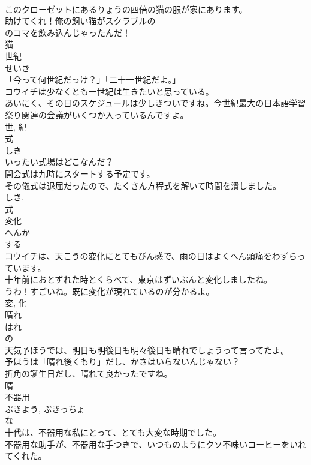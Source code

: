 \documentclass[8pt]{extreport}
\begin{document}
\begin{CJK}{UTF8}{min}
\\	このクローゼットにあるりょうの四倍の猫の服が家にあります。	
\\	助けてくれ！俺の飼い猫がスクラブルの 
\\	のコマを飲み込んじゃったんだ！	
\\	猫	
\\	世紀	
\\	せいき	
\\	「今って何世紀だっけ？」「二十一世紀だよ。」	
\\	コウイチは少なくとも一世紀は生きたいと思っている。	
\\	あいにく、その日のスケジュールは少しきついですね。今世紀最大の日本語学習祭り関連の会議がいくつか入っているんですよ。	
\\	世, 紀	
\\	式	
\\	しき	
\\	いったい式場はどこなんだ？	
\\	開会式は九時にスタートする予定です。	
\\	その儀式は退屈だったので、たくさん方程式を解いて時間を潰しました。	
\\	しき, 
\\	式	
\\	変化	
\\	へんか	
\\	する 
\\	コウイチは、天こうの変化にとてもびん感で、雨の日はよくへん頭痛をわずらっています。	
\\	十年前におとずれた時とくらべて、東京はずいぶんと変化しましたね。	
\\	うわ！すごいね。既に変化が現れているのが分かるよ。	
\\	変, 化	
\\	晴れ	
\\	はれ	
\\	の 
\\	天気予ほうでは、明日も明後日も明々後日も晴れでしょうって言ってたよ。	
\\	予ほうは「晴れ後くもり」だし、かさはいらないんじゃない？	
\\	折角の誕生日だし、晴れて良かったですね。	
\\	晴	
\\	不器用	
\\	ぶきよう, ぶきっちょ	
\\	な 
\\	十代は、不器用な私にとって、とても大変な時期でした。	
\\	不器用な助手が、不器用な手つきで、いつものようにクソ不味いコーヒーをいれてくれた。	

\end{CJK}
\end{document}
